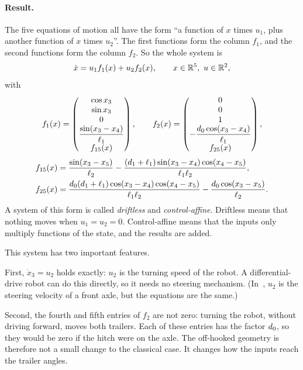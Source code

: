 \paragraph{Result.}
The five equations of motion all have the form ``a function of $x$ times $u_1$,
plus another function of $x$ times $u_2$''. The first functions form the column
$f_1$, and the second functions form the column $f_2$. So the whole system is
\begin{equation}
  \dot x=u_1f_1(x)+u_2f_2(x),\qquad x\in\mathbb{R}^5,\ u\in\mathbb{R}^2,
  \label{eq:system}
\end{equation}
with
\begin{equation}
  f_1(x)=\begin{pmatrix}\cos x_3\\ \sin x_3\\ 0\\
        \dfrac{\sin(x_3-x_4)}{\ell_1}\\ f_{15}(x)\end{pmatrix},\qquad
  f_2(x)=\begin{pmatrix}0\\ 0\\ 1\\
        -\dfrac{d_0\cos(x_3-x_4)}{\ell_1}\\ f_{25}(x)\end{pmatrix},
  \label{eq:fields}
\end{equation}
\begin{align}
  f_{15}(x)&=\frac{\sin(x_3-x_5)}{\ell_2}
     -\frac{(d_1+\ell_1)\sin(x_3-x_4)\cos(x_4-x_5)}{\ell_1\ell_2},\\
  f_{25}(x)&=\frac{d_0(d_1+\ell_1)\cos(x_3-x_4)\cos(x_4-x_5)}{\ell_1\ell_2}
     -\frac{d_0\cos(x_3-x_5)}{\ell_2}.
\end{align}
A system of this form is called \emph{driftless} and \emph{control-affine}.
Driftless means that nothing moves when $u_1=u_2=0$. Control-affine means that
the inputs only multiply functions of the state, and the results are added.

This system has two important features.

First, $\dot x_3=u_2$ holds exactly: $u_2$ is the turning speed of the robot. A
differential-drive robot can do this directly, so it needs no steering
mechanism. (In~\cite{zuyev2024}, $u_2$ is the steering velocity of a front axle,
but the equations are the same.)

Second, the fourth and fifth entries of $f_2$ are not zero: turning the robot,
without driving forward, moves both trailers. Each of these entries has the
factor $d_0$, so they would be zero if the hitch were on the axle. The
off-hooked geometry is therefore not a small change to the classical case. It
changes how the inputs reach the trailer angles.

